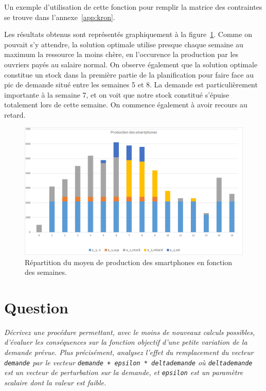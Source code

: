 \documentclass[12pt,oneside,a4paper]{article}
\newcommand{\question}
{
\addtocounter{section}{1}
\section*{Question \thesection}
}
\begin{document}
Un exemple d'utilisation de cette fonction pour remplir la matrice
des contraintes se trouve dans l'annexe~\ref{app:kron}.

Les résultats obtenus sont représentés graphiquement 
à la figure~\ref{fig:grapheProduction}. 
Comme on pouvait s'y attendre, la solution optimale utilise presque chaque
semaine au maximum la ressource la moins chère,
en l'occurence la production par les ouvriers payés au salaire normal.
On observe également que la solution optimale constitue un stock dans la première partie de la planification pour faire face au pic de demande 
situé entre les semaines 5 et 8.
La demande est particulièrement importante à la semaine 7,
et on voit que notre stock constitué s'épuise totalement lors de cette semaine.
On commence également à avoir recours au retard.

\begin{figure}[H]
  \begin{center}
    \includegraphics[scale = 0.8]{img/grapheProduction.png}
	  \caption{Répartition du moyen de production des smartphones en fonction des semaines.}
	  \label{fig:grapheProduction}
  \end{center}
\end{figure}

\question %
\emph{Décrivez une procédure permettant, avec le moins de nouveaux calculs
possibles, d'évaluer les conséquences sur la fonction objectif d’une petite
variation de la demande prévue. Plus précisément, analysez l'effet du
remplacement du vecteur \texttt{demande} 
par le vecteur \texttt{demande + epsilon * delta\textunderscore demande} 
où \texttt{delta\textunderscore demande} est un vecteur de perturbation 
sur la demande, 
et \texttt{epsilon} est un paramètre scalaire dont la valeur est faible.}
\end{document}
